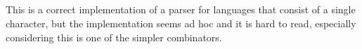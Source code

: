 \begin{code}%
%
\>[4]\AgdaSpace{}%
\AgdaSymbol{:}\AgdaSpace{}%
\AgdaSymbol{(}\AgdaSpace{}%
\AgdaSymbol{:}\AgdaSpace{}%
\AgdaSymbol{)}\AgdaSpace{}%
\AgdaSpace{}%
\AgdaSpace{}%
\AgdaSymbol{(}\AgdaSpace{}%
\AgdaSymbol{)}\<%
\\
%
\>[4]\AgdaSymbol{(}\AgdaSpace{}%
\AgdaSymbol{\AgdaUnderscore{})}\AgdaSpace{}%
\AgdaInductiveConstructor{[]}\AgdaSpace{}%
\AgdaSymbol{=}\AgdaSpace{}%
\AgdaSpace{}%
\AgdaSpace{}%
\AgdaSymbol{()}\<%
\\
%
\>[4]\AgdaSymbol{(}\AgdaSpace{}%
\AgdaSymbol{)}\AgdaSpace{}%
\AgdaSymbol{(}\AgdaSpace{}%
\AgdaSpace{}%
\AgdaInductiveConstructor{[]}\AgdaSymbol{)}\AgdaSpace{}%
\AgdaSymbol{=}\<%
\\
\>[4][@{}l@{\AgdaIndent{0}}]%
\>[8]\AgdaSpace{}%
\AgdaSymbol{(}\AgdaSpace{}%
\AgdaSpace{}%
\AgdaSymbol{\{}\AgdaSpace{}%
\AgdaSpace{}%
\AgdaSpace{}%
\AgdaSpace{}%
\AgdaSymbol{\})}\AgdaSpace{}%
\AgdaSpace{}%
\AgdaSymbol{\{}\AgdaSpace{}%
\AgdaSpace{}%
\AgdaSpace{}%
\AgdaSpace{}%
\AgdaSymbol{\}))}\AgdaSpace{}%
\AgdaSymbol{(}\AgdaSpace{}%
\AgdaSpace{}%
\AgdaSymbol{)}\<%
\\
%
\>[4]\AgdaSymbol{(}\AgdaSpace{}%
\AgdaSymbol{\AgdaUnderscore{})}\AgdaSpace{}%
\AgdaSymbol{(\AgdaUnderscore{}}\AgdaSpace{}%
\AgdaSpace{}%
\AgdaSymbol{\AgdaUnderscore{}}\AgdaSpace{}%
\AgdaSpace{}%
\AgdaSymbol{\AgdaUnderscore{})}\AgdaSpace{}%
\AgdaSymbol{=}\AgdaSpace{}%
\AgdaSpace{}%
\AgdaSpace{}%
\AgdaSymbol{()}\<%
\end{code}

This is a correct implementation of a parser for languages that consist of a single character, but the implementation seems ad hoc and it is hard to read, especially considering this is one of the simpler combinators.

